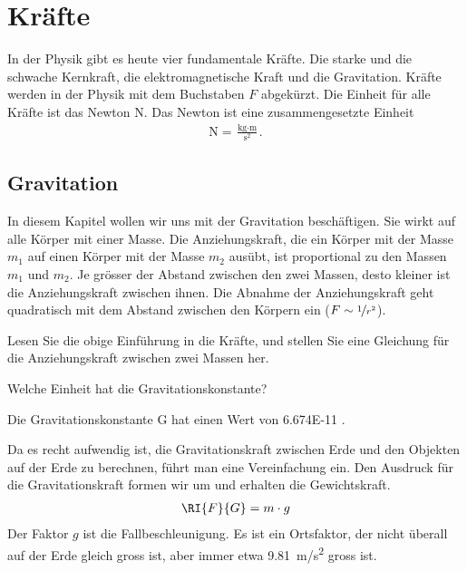 
\section*{Kräfte}
In der Physik gibt es heute vier fundamentale Kräfte. Die starke und die schwache Kernkraft, die elektromagnetische Kraft und die Gravitation.
Kräfte werden in der Physik mit dem Buchstaben $F$ abgekürzt.
Die Einheit für alle Kräfte ist das Newton N. Das Newton ist eine zusammengesetzte Einheit
\begin{eqnarray*}
	\text{N}=\frac{\text{kg}\cdot\text{m}}{\text{s}^2}\text{.}
\end{eqnarray*}

\subsection*{Gravitation}
In diesem Kapitel wollen wir uns mit der Gravitation beschäftigen. Sie wirkt auf alle Körper mit einer Masse.
Die Anziehungskraft, die ein Körper mit der Masse $m_1$ auf einen Körper mit der Masse $m_2$ ausübt, ist proportional zu den Massen $m_1$ und $m_2$.
Je grösser der Abstand zwischen den zwei Massen, desto kleiner ist die Anziehungskraft zwischen ihnen. Die Abnahme der Anziehungskraft geht quadratisch
mit dem Abstand zwischen den Körpern ein ($F\sim\nicefrac{1}{r^2}$).


\begin{aufgabe}
	Lesen Sie die obige Einführung in die Kräfte, und stellen Sie eine Gleichung für die Anziehungskraft zwischen zwei Massen her. 
\end{aufgabe}
\vspace*{2.5cm}
\begin{aufgabe}
	Welche Einheit hat die Gravitationskonstante? 
\end{aufgabe}

\vspace*{2.5cm}
Die Gravitationskonstante G hat einen Wert von \num{6.674E-11} \gl.


Da es recht aufwendig ist, die Gravitationskraft zwischen Erde und den Objekten auf der Erde zu berechnen, führt man eine Vereinfachung ein.
Den Ausdruck für die Gravitationskraft formen wir um und erhalten die Gewichtskraft. 
\begin{eqnarray*}
	\RI{F}{G} = m\cdot g
\end{eqnarray*}
Der Faktor $g$ ist die Fallbeschleunigung. Es ist ein Ortsfaktor, der nicht überall auf der Erde gleich gross ist, aber immer etwa
\SI{9.81}{m/s^2} gross ist.


